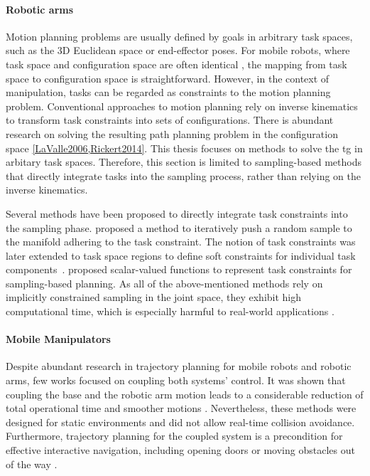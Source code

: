 \paragraph{Robotic arms}%

Motion planning problems are usually defined by goals in
arbitrary task spaces, such as the 3D Euclidean space or
end-effector poses. For mobile robots, where task space and
configuration space are often identical \cite{LaValle2006},
the mapping from task space to configuration space is
straightforward. However, in the context of manipulation,
tasks can be regarded as constraints to the motion planning
problem. Conventional approaches to motion planning rely on
inverse kinematics to transform task constraints into sets
of configurations. There is abundant research on
solving the resulting path planning problem in the
configuration space \cref{LaValle2006,Rickert2014}. This
thesis focuses on methods to solve the \ac{tg} in arbitary
task spaces. Therefore, this section is limited to
sampling-based methods that directly integrate tasks into
the sampling process, rather than relying on the inverse
kinematics.

Several methods have been proposed to
directly integrate task constraints into the sampling phase.
\cite{Stilman2010} proposed a method to iteratively push a
random sample to the manifold adhering to the task
constraint. The notion of task constraints was later
extended to task space regions to define soft constraints
for individual task components~\cite{Berenson2011}.
\cite{Kingston2019} proposed scalar-valued functions to
represent task constraints for sampling-based planning. As
all of the above-mentioned methods rely on implicitly
constrained sampling in the joint space, they exhibit high
computational time, which is especially harmful to
real-world applications \cite{qureshi2021constrained}.

\paragraph{Mobile Manipulators}

Despite abundant research in trajectory planning for mobile robots and robotic
arms, few works focused on coupling both systems' control. It was shown that
coupling the base and the robotic arm motion leads to a considerable reduction
of total operational time and smoother motions \cite{Thakar2018, Thakar2019}.
Nevertheless, these methods were designed for static environments and did not
allow real-time collision avoidance. Furthermore, trajectory planning for the
coupled system is a precondition for effective interactive navigation, including
opening doors \cite{Jain2009, Chitta2010} or moving obstacles out of the way
\cite{Li2019}.

